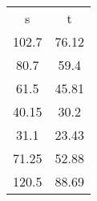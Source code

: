 \begin{table}
\begin{tabular}{cc}
s & t \\
102.7 & 76.12 \\
80.7 & 59.4 \\
61.5 & 45.81 \\
40.15 & 30.2 \\
31.1 & 23.43 \\
71.25 & 52.88 \\
120.5 & 88.69 \\
\end{tabular}
\end{table}
